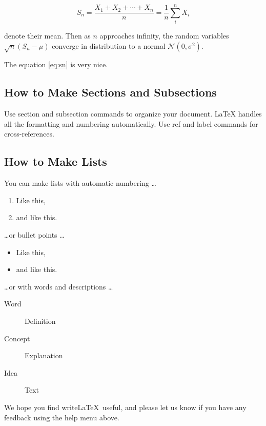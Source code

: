 \documentclass[a4paper]{article}
\begin{document}
      \begin{equation}
      S_n = \frac{X_1 + X_2 + \cdots + X_n}{n}
            = \frac{1}{n}\sum_{i}^{n} X_i
      \label{eq:sn}
      \end{equation}
      
      denote their mean. Then as $n$ approaches infinity, the random variables $\sqrt{n}(S_n - \mu)$ converge in distribution to a normal $\mathcal{N}(0, \sigma^2)$.
      
      The equation \ref{eq:sn} is very nice.
      
      \subsection{How to Make Sections and Subsections}
      
      Use section and subsection commands to organize your document. \LaTeX{} handles all the formatting and numbering automatically. Use ref and label commands for cross-references.
      
      \subsection{How to Make Lists}
      
      You can make lists with automatic numbering \dots
      
      \begin{enumerate}
      \item Like this,
      \item and like this.
      \end{enumerate}
      \dots or bullet points \dots
      \begin{itemize}
      \item Like this,
      \item and like this.
      \end{itemize}
      \dots or with words and descriptions \dots
      \begin{description}
      \item[Word] Definition
      \item[Concept] Explanation
      \item[Idea] Text
      \end{description}
      
      We hope you find write\LaTeX\ useful, and please let us know if you have any feedback using the help menu above.
      
      
\end{document}
